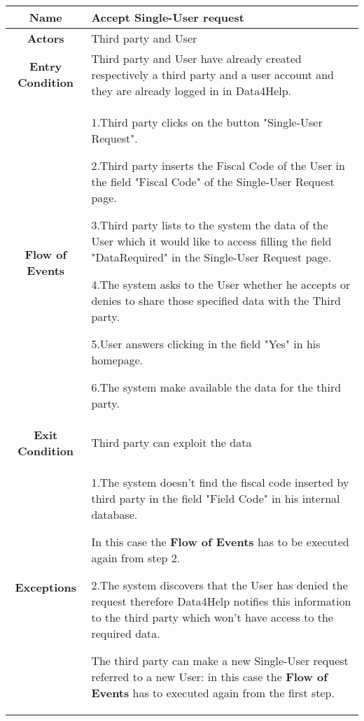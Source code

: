 \subsubsection{}
 \begin{table}[h!]
   \centering
    \begin{tabularx}{\linewidth}{|c|X|}
         \hline
         \textbf{Name} & Accept Single-User request\\
	\hline
	\textbf{Actors} & Third party and User \\
	\hline
	\textbf{Entry Condition} & Third party and User have already created respectively a third party and a user account and they 							are already logged in in Data4Help.\\
	\hline
	\textbf{Flow of Events} & 1.Third party clicks on the button "Single-User Request".

					2.Third party inserts the Fiscal Code of the User in the field "Fiscal Code" of the Single-User 								Request page.

					3.Third party lists to the system the data of the User which it would like to access filling the field 							"DataRequired" in the Single-User Request page.

					4.The system asks to the User whether he accepts or denies to share those specified data with the 					Third party.

					5.User answers clicking in the field "Yes" in his homepage.

					6.The system make available the data for the third party.\\
	\hline
	\textbf{Exit Condition} & Third party can exploit the data \\
	\hline
	\textbf{Exceptions} & 1.The system doesn't find the fiscal code inserted by third party in the field "Field Code" in his internal 				database.

				In this case the \textbf{Flow of Events} has to be executed again from step 2. 

				2.The system discovers that the User has denied the request therefore Data4Help notifies this 							information to the third party which won't have access to the required data.

				The third party can 	make a new Single-User request referred to a new User: in this case the 							\textbf{Flow of Events} has to executed again from the first step.\\

        \hline
      \end{tabularx}
      \end{table}

